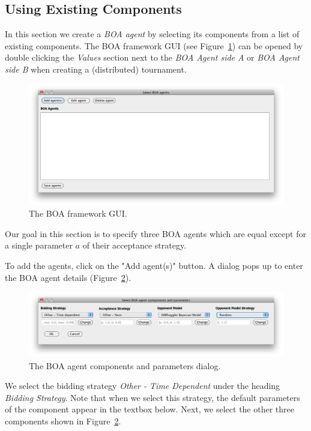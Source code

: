 \documentclass[]{article}
\begin{document}
\subsection{Using Existing Components}
In this section we create a \textit{BOA agent} by selecting its components from a list of existing components. The BOA framework GUI (see Figure~\ref{fig:decoupledGUI}) can be opened by double clicking the \textit{Values} section next to the \textit{BOA Agent side A} or \textit{BOA Agent side B} when creating a (distributed) tournament.

\begin{figure}[h!]
	\center
	\includegraphics[width=15cm]{media/BOAgui.png}
	\caption{The BOA framework GUI.}
	\label{fig:decoupledGUI}
\end{figure}

Our goal in this section is to specify three BOA agents which are equal except for a single parameter $a$ of their acceptance strategy. 

To add the agents, click on the "Add agent(s)" button. A dialog pops up to enter the BOA agent details (Figure~\ref{fig:boadetails}).

\begin{figure}[h!]
	\center
	\includegraphics[width=15cm]{media/BOAdetails.png}
	\caption{The BOA agent components and parameters dialog.}
	\label{fig:boadetails}
\end{figure}

We select the bidding strategy \textit{Other - Time Dependent} under the heading \textit{Bidding Strategy}. Note that when we select this strategy, the default parameters of the component appear in the textbox below. Next, we select the other three components shown in Figure~\ref{fig:boadetails}.
\end{document}
